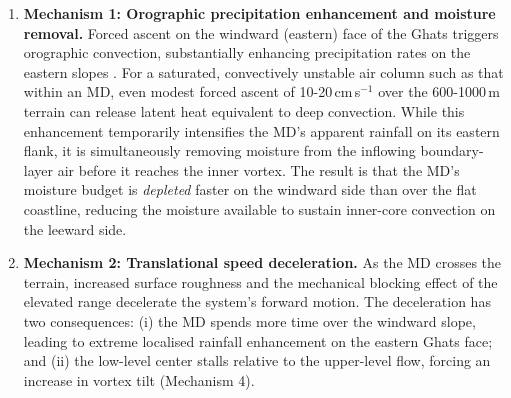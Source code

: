 \begin{enumerate}
  \item \textbf{Mechanism 1: Orographic precipitation enhancement and
    moisture removal.} Forced ascent on the windward (eastern)
    face of the Ghats  triggers orographic convection, substantially
    enhancing precipitation rates on the eastern slopes
    \autocite{houze1994, orographyconvection2005, medina2003analysis}.
    For a saturated, convectively unstable air column such as that
    within an MD, even modest forced ascent of 10-20\,cm\,s$^{-1}$
    over the 600-1000\,m terrain can release latent heat equivalent
    to deep convection. While this enhancement temporarily
    intensifies the MD's apparent rainfall on its eastern flank, it
    is simultaneously removing moisture from the inflowing
    boundary-layer air before it reaches the inner vortex. The result
    is that the MD's moisture budget is \emph{depleted} faster on the
    windward side than over the flat coastline, reducing the moisture
    available to sustain inner-core convection on the leeward side.
  \item \textbf{Mechanism 2: Translational speed deceleration.} As
    the MD crosses the terrain, increased surface roughness and the
    mechanical blocking effect of the elevated range decelerate the
    system's forward motion.
    The deceleration has two consequences: (i) the MD spends more
    time over the windward slope, leading to extreme localised
    rainfall enhancement on the eastern Ghats face; and (ii) the
    low-level center stalls relative to the upper-level flow, forcing
    an increase in vortex tilt (Mechanism 4).

\end{enumerate}
